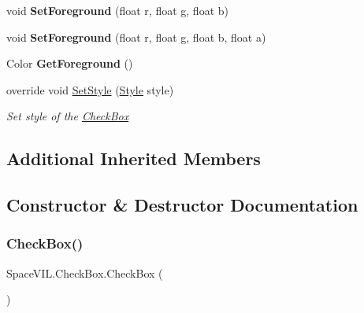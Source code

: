 \begin{DoxyCompactItemize}
\item 
\mbox{\label{class_space_v_i_l_1_1_check_box_a862fafe76738b5c9c9430d24dd833e7b}} 
void {\bfseries Set\+Foreground} (float r, float g, float b)
\item 
\mbox{\label{class_space_v_i_l_1_1_check_box_a089c161c0b2fa6d042ecb4d2bf791a29}} 
void {\bfseries Set\+Foreground} (float r, float g, float b, float a)
\item 
\mbox{\label{class_space_v_i_l_1_1_check_box_a7b4c78bb81dd8ace000705afe14bacdc}} 
Color {\bfseries Get\+Foreground} ()
\item 
override void \mbox{\hyperlink{class_space_v_i_l_1_1_check_box_a123c8ba848fb10601c5ee80681410f23}{Set\+Style}} (\mbox{\hyperlink{class_space_v_i_l_1_1_decorations_1_1_style}{Style}} style)
\begin{DoxyCompactList}\small\item\em Set style of the \mbox{\hyperlink{class_space_v_i_l_1_1_check_box}{Check\+Box}} \end{DoxyCompactList}\end{DoxyCompactItemize}
\subsection*{Additional Inherited Members}


\subsection{Constructor \& Destructor Documentation}
\mbox{\label{class_space_v_i_l_1_1_check_box_ac4cc39e7a28c54aa260902b2d742e0e8}} 
\subsubsection{\texorpdfstring{Check\+Box()}{CheckBox()}}
{\footnotesize\ttfamily Space\+V\+I\+L.\+Check\+Box.\+Check\+Box (\begin{DoxyParamCaption}{ }\end{DoxyParamCaption})\hspace{0.3cm}{\ttfamily [inline]}}



